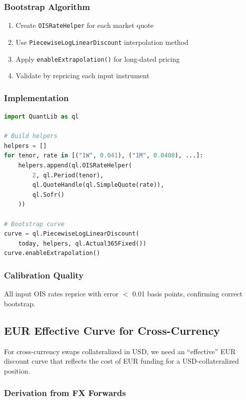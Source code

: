 \documentclass[10pt,a4paper]{article}
\begin{document}
\subsubsection{Bootstrap Algorithm}

\begin{enumerate}
    \item Create \texttt{OISRateHelper} for each market quote
    \item Use \texttt{PiecewiseLogLinearDiscount} interpolation method
    \item Apply \texttt{enableExtrapolation()} for long-dated pricing
    \item Validate by repricing each input instrument
\end{enumerate}

\subsubsection{Implementation}

\begin{lstlisting}[language=Python]
import QuantLib as ql

# Build helpers
helpers = []
for tenor, rate in [("1W", 0.041), ("1M", 0.0408), ...]:
    helpers.append(ql.OISRateHelper(
        2, ql.Period(tenor),
        ql.QuoteHandle(ql.SimpleQuote(rate)),
        ql.Sofr()
    ))

# Bootstrap curve
curve = ql.PiecewiseLogLinearDiscount(
    today, helpers, ql.Actual365Fixed())
curve.enableExtrapolation()
\end{lstlisting}

\subsubsection{Calibration Quality}

All input OIS rates reprice with error $<$ 0.01 basis points, confirming correct bootstrap.

\subsection{EUR Effective Curve for Cross-Currency}

For cross-currency swaps collateralized in USD, we need an ``effective'' EUR discount curve that reflects the cost of EUR funding for a USD-collateralized position.

\subsubsection{Derivation from FX Forwards}
\end{document}
